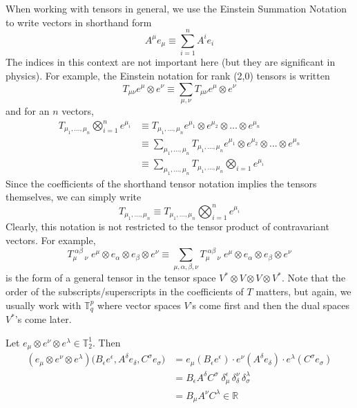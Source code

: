   When working with tensors in general, we use the Einstein Summation Notation to write vectors in shorthand form
  \[ A^{\mu} e_{\mu} \equiv \sum_{i=1}^{n} A^{i} e_{i}\]
  The indices in this context are not important here (but they are significant in physics). For example, the Einstein notation for rank (2,0) tensors is written
  \[ T_{\mu \nu} e^{\mu} \otimes e^{\nu} \equiv \sum_{\mu, \nu} T_{\mu \nu} e^{\mu} \otimes e^{\nu}\]
  and for an $n$ vectors, 
  \begin{align*}
  T_{\mu_{1}, ..., \mu_{n}} \bigotimes_{i=1}^{n} e^{\mu_{i}} & \equiv T_{\mu_{1}, ..., \mu_{n}} e^{\mu_{1}} \otimes e^{\mu_{2}} \otimes ... \otimes e^{\mu_{n}} \\
       & \equiv \sum_{\mu_{1}, ..., \mu_{n}} T_{\mu_{1}, ..., \mu_{n}} e^{\mu_{1}} \otimes e^{\mu_{2}} \otimes ... \otimes e^{\mu_{n}} \\
       & \equiv \sum_{\mu_{1}, ..., \mu_{n}} T_{\mu_{1}, ..., \mu_{n}} \bigotimes_{i=1} e^{\mu_{i}}
  \end{align*}
  Since the coefficients of the shorthand tensor notation implies the tensors themselves, we can simply write
  \[ T_{\mu_{1}, ..., \mu_{n}} \equiv T_{\mu_{1}, ..., \mu_{n}} \bigotimes_{i=1}^{n} e^{\mu_{i}} \]
  Clearly, this notation is not restricted to the tensor product of contravariant vectors. For example,
  \[T_{\mu \;\;\;\;\nu}^{\; \alpha \beta} \; e^{\mu} \otimes e_{\alpha} \otimes e_{\beta} \otimes e^{\nu}  \equiv \sum_{\mu, \alpha, \beta, \nu} T_{\mu \;\;\;\; \nu}^{\; \alpha \beta} \; e^{\mu} \otimes e_{\alpha} \otimes e_{\beta} \otimes e^{\nu}\]
  is the form of a general tensor in the tensor space $V^* \otimes V \otimes V \otimes V^*$. Note that the order of the subscripts/superscripts in the coefficients of $T$ matters, but again, we usually work with $\mathbb{T}^p_q$ where vector spaces $V$'s come first and then the dual spaces $V^*$'s come later. 

  \begin{example}
  Let $e_{\mu} \otimes e^{\nu} \otimes e^{\lambda} \in \mathbb{T}^{1}_{2}$. Then 
  \begin{align*}
  (e_{\mu} \otimes e^{\nu} \otimes e^{\lambda}) \big( B_{\epsilon} e ^{\epsilon}, A^{\delta} e_{\delta}, C^{\sigma} e_{\sigma} \big) & = e_{\mu} (B_{\epsilon} e^{\epsilon}) \cdot e^{\nu} (A^{\delta} e_{\delta}) \cdot e^{\lambda} (C^\sigma e_{\sigma}) \\
   & = B_{\epsilon} A^{\delta} C^{\sigma} \; \delta_{\mu}^{\epsilon} \, \delta_{\delta}^{\nu} \, \delta_{\sigma}^{\lambda} \\
   & = B_{\mu} A^{\nu} C^{\lambda} \in \mathbb{R} 
   \end{align*}
  \end{example}


